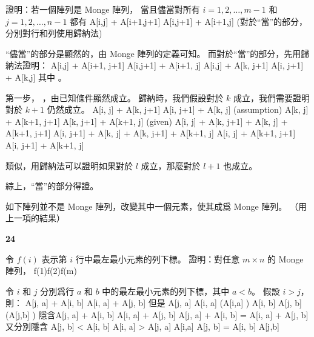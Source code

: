 \startigBase[a]
\startitem 證明：若一個陣列是 Monge 陣列，
當且儘當對所有 $i=1,2,\ldots,m-1$ 和 $j = 1,2,\ldots,n-1$ 都有
\startformula
A[i,j] + A[i+1,j+1] \le A[i,j+1] + A[i+1,j]
\stopformula
(\hint 對於“當”的部分，分別對行和列使用歸納法)
\stopitem

\startANSWER
“儘當”的部分是顯然的，由 Monge 陣列的定義可知。
而對於“當”的部分，先用歸納法證明：
\startsplitformula\startmathalignment[n=1]
\NC A[i,j] + A[i+1, j+1] \le A[i,j+1] + A[i+1, j] \NR
\NC \Downarrow \NR
\NC A[i,j] + A[k, j+1] \le A[i, j+1] + A[k,j] \NR
\stopmathalignment\stopsplitformula
其中 。

第一步， ，由已知條件顯然成立。
歸納時，我們假設對於 $k$ 成立，我們需要證明對於 $k+1$ 仍然成立。
\startsplitformula\startmathalignment[n=1]
\NC A[i, j] + A[k, j+1] \le A[i, j+1] + A[k, j] \quad (assumption) \NR
\NC A[k, j] + A[k+1, j+1] \le A[k, j+1] + A[k+1, j] \quad (given) \NR
\NC \Downarrow \NR
\NC A[i, j] + A[k, j+1] + A[k, j] + A[k+1, j+1] \le A[i, j+1] + A[k, j] + A[k, j+1] + A[k+1, j] \NR
\NC \Downarrow \NR
\NC A[i, j] + A[k+1, j+1] \le A[i, j+1] + A[k+1, j] \NR
\stopmathalignment\stopsplitformula

類似，用歸納法可以證明如果對於 $l$ 成立，那麼對於 $l+1$ 也成立。

綜上，“當”的部分得證。
\stopANSWER

\startitem
如下陣列並不是 Monge 陣列，改變其中一個元素，使其成爲 Monge 陣列。
（\hint 用上一項的結果）
\startsplitformula\startmatrix
{}    \NR
{}    \NR
{}    \NR
{}    \NR
{}    \NR
\stopmatrix\stopsplitformula
\stopitem

\startANSWER
\startsplitformula\startmatrix
{}  \NC \bf 24  \NR
{}    \NR
{}    \NR
{}    \NR
{}    \NR
\stopmatrix\stopsplitformula
\stopANSWER

\item 令 $f(i)$ 表示第 $i$ 行中最左最小元素的列下標。
證明：對任意 $m\times n$ 的 Monge 陣列，
\startformula
f(1)\le f(2)\le\cdots\le f(m)
\stopformula

\startANSWER
令 $i$ 和 $j$ 分別爲行 $a$ 和 $b$ 中的最左最小元素的列下標，其中 $a < b$。
假設 $i>j$，則：
\startformula
A[j, a] + A[i, b] \le A[i, a] + A[j, b]
\stopformula
但是\startsplitformula\startmathalignment
\NC A[j, a] \ge A[i, a] \NC \quad (A[i,a] ) \NR
\NC A[i, b] \ge A[j, b] \NC \quad (A[j,b] ) \NR
\stopmathalignment\stopsplitformula
隱含\startsplitformula\startmathalignment[n=1]
\NC A[j, a] + A[i, b] \ge A[i, a] + A[j, b] \NR
\NC \Downarrow \NR
\NC A[j, a] + A[i, b] = A[i, a] + A[j, b] \NR
\stopmathalignment\stopsplitformula
又分別隱含\startsplitformula\startmathalignment
\NC A[j, b] < A[i, b] \Rightarrow A[i, a] > A[j, a] \NC \Rightarrow A[i,a]  \NR
\NC A[j, b] = A[i, b] \NC \Rightarrow A[j,b]  \NR
\stopmathalignment\stopsplitformula

